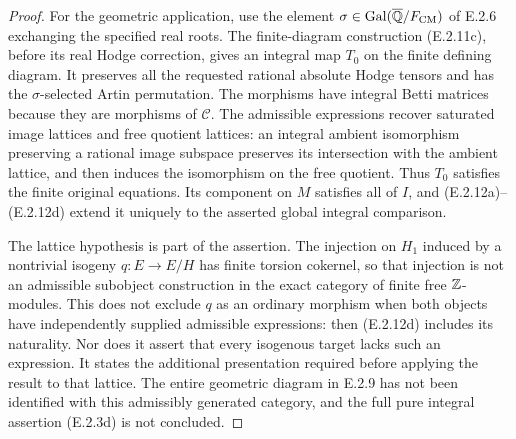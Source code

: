 \begin{proof}
For the geometric application, use the element
$\sigma\in\operatorname{Gal}(\overline{\mathbb Q}/F_{\rm CM})$ of E.2.6 exchanging the specified
real roots. The finite-diagram construction (E.2.11c), before its
real Hodge correction, gives an integral map $T_0$ on the finite
defining diagram. It preserves all the requested rational absolute
Hodge tensors and has the $\sigma$-selected Artin permutation.
The morphisms have integral Betti matrices because they are
morphisms of $\mathcal C$. The admissible expressions recover
saturated image lattices and free quotient lattices: an integral
ambient isomorphism preserving a rational image subspace preserves
its intersection with the ambient lattice, and then induces the
isomorphism on the free quotient. Thus $T_0$ satisfies the finite
original equations. Its component on $M$ satisfies all of $I$,
and (E.2.12a)--(E.2.12d) extend it uniquely to the asserted
global integral comparison.

The lattice hypothesis is part of the assertion. The injection
on $H_1$ induced by a nontrivial isogeny $q:E\to E/H$ has finite
torsion cokernel, so that injection is not an admissible subobject
construction in the exact category of finite free $\mathbb Z$-modules.
This does not exclude $q$ as an ordinary morphism when both
objects have independently supplied admissible expressions:
then (E.2.12d) includes its naturality. Nor does it assert that
every isogenous target lacks such an expression. It states the
additional presentation required before applying the result to
that lattice. The entire geometric diagram in E.2.9 has not been
identified with this admissibly generated category, and the full
pure integral assertion (E.2.3d) is not concluded.
\end{proof}
